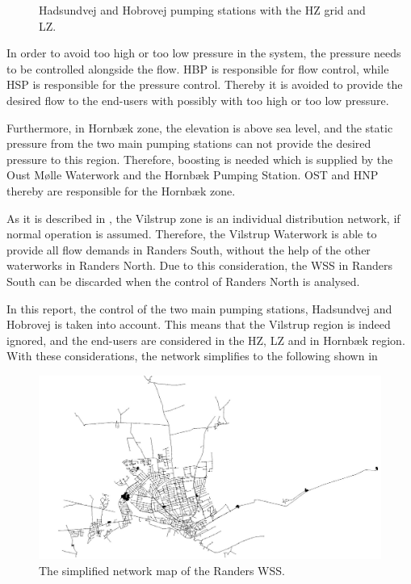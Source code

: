 \begin{figure}[H]
\centering

\caption{Hadsundvej and Hobrovej pumping stations with the HZ grid and LZ.}
\label{fig:HBP_HSP_grid}
\end{figure}

In order to avoid too high or too low pressure in the system, the pressure needs to be controlled alongside the flow. HBP is responsible for flow control, while HSP is responsible for the pressure control. Thereby it is avoided to provide the desired flow to the end-users with possibly with too high or too low pressure. 

Furthermore, in Hornbæk zone, the elevation is above sea level, and the static pressure from the two main pumping stations can not provide the desired pressure to this region. Therefore, boosting is needed which is supplied by the Oust Mølle Waterwork and the Hornbæk Pumping Station. OST and HNP thereby are responsible for the Hornbæk zone.

As it is described in , the Vilstrup zone is an individual distribution network, if normal operation is assumed. Therefore, the Vilstrup Waterwork is able to provide all flow demands in Randers South, without the help of the other waterworks in Randers North. Due to this consideration, the WSS in Randers South can be discarded when the control of Randers North is analysed. 

In this report, the control of the two main pumping stations, Hadsundvej and Hobrovej is taken into account. This means that the Vilstrup region is indeed ignored, and the end-users are considered in the HZ, LZ and in Hornbæk region. With these considerations, the network simplifies to the following shown in 

\begin{figure}[H]
\centering
\includegraphics[width=1.02\textwidth]{report/pictures/verdo_pic2}
\caption{The simplified network map of the Randers WSS.}
\label{fig:simplified_network}
\end{figure}

